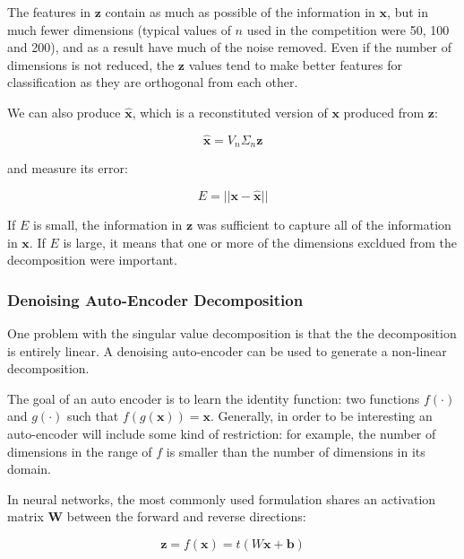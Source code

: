 \documentclass{article}
\begin{document}
The features in $\mathbf{z}$ contain as much as possible of the information in $\mathbf{x}$, but in much fewer dimensions (typical values of $n$ used in the competition were 50, 100 and 200), and as a result have much of the noise removed.  Even if the number of dimensions is not reduced, the $\mathbf{z}$ values tend to make better features for classification as they are orthogonal from each other.

We can also produce $\hat{\mathbf{x}}$, which is a reconstituted version of $\mathbf{x}$ produced from $\mathbf{z}$:

\begin{equation}
\hat{\mathbf{x}} = V_n \Sigma_n \mathbf{z}
\end{equation}

and measure its error:

\begin{equation}
\label{eqn:decomp-error}
E = || \mathbf{x - \hat{x}} ||
\end{equation}

If $E$ is small, the information in $\mathbf{z}$ was sufficient to capture all of the information in $\mathbf{x}$.  If $E$ is large, it means that one or more of the dimensions excldued from the decomposition were important.


\subsubsection{Denoising Auto-Encoder Decomposition}

One problem with the singular value decomposition is that the the decomposition is entirely linear.  A denoising auto-encoder \cite{Vincent-TR1316} can be used to generate a non-linear decomposition.

The goal of an auto encoder is to learn the identity function: two functions $f(\cdot)$ and $g(\cdot)$ such that $f(g(\mathbf{x})) = \mathbf{x}$.  Generally, in order to be interesting an auto-encoder will include some kind of restriction: for example, the number of dimensions in the range of $f$ is smaller than the number of dimensions in its domain.

In neural networks, the most commonly used formulation shares an activation matrix $\mathbf{W}$ between the forward and reverse directions:

\begin{equation}
\label{eqn:autoencoder-encode}
\mathbf{z} = f(\mathbf{x}) = t(W\mathbf{x} + \mathbf{b})
\end{equation}
\end{document}
